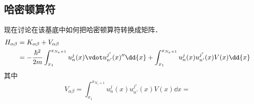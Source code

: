 \subsection{哈密顿算符}
现在讨论在该基底中如何把哈密顿算符转换成矩阵．
 \begin{equation}\begin{aligned}
H_{\alpha\beta} &= K_{\alpha\beta}+V_{\alpha\beta} \\
&= -\frac{\hbar^2}{2m} \int_{x_1}^{x_{N_e+1}} u_n^j(x)\vdot u_{n'}^{j'}(x)'' \dd{x}
+ \int_{x_1}^{x_{N_e+1}} u_n^j(x) u_{n'}^{j'}(x) V(x) \dd{x}
\end{aligned}\end{equation}
其中
\begin{equation}
V_{\alpha\beta} = \int_{x_1}^{x_{N_e+1}} u_n^j (x) u_{n'}^{j'} (x) V(x) \dd{x} = %
\end{equation}







